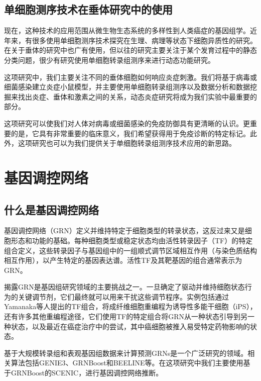 \subsection{单细胞测序技术在垂体研究中的使用}
  现在，这种技术的应用范围从微生物生态系统的多样性到人类癌症的基因组学。近年来，有很多使用单细胞测序技术探究在生理、病理等状态下细胞异质性的研究\cite{hammond2019single,keren2017unique,li2019developmental,masuda2019spatial,masuda2020novel,matcovitch2016microglia}。
在关于垂体的研究中也广有使用，但以往的研究\cite{chen2020single,cheung2018single,ho2020single,fletcher2019cell}主要关注于某个发育过程中的静态分类问题，很少有研究使用单细胞转录组测序来进行动态功能研究。

  这项研究中，我们主要关注不同的垂体细胞如何响应炎症刺激。我们将基于病毒或细菌感染建立炎症小鼠模型，并主要使用单细胞转录组测序以及数据分析和数据挖掘来找出炎症、垂体和激素之间的关系，动态炎症研究将成为我们实验中最重要的部分。

  这项研究可以使我们对人体对病毒或细菌感染的免疫防御具有更清晰的认识。更重要的是，它具有非常重要的临床意义，我们希望获得用于免疫诊断的特定标记。此外，这项研究也可以为我们提供关于单细胞转录组测序技术应用的新思路。

\section{基因调控网络}

\subsection{什么是基因调控网络}
  基因调控网络（GRN）定义并维持特定于细胞类型的转录状态，这反过来又是细胞形态和功能的基础。每种细胞类型或稳定状态均由活性转录因子（TF）的特定组合定义，这些转录因子与基因组中的一组顺式调节区域相互作用（与染色质结构相互作用），以产生特定的基因表达谱\cite{fiers2018mapping,arendt2016origin}。活性TF及其靶基因的组合通常表示为GRN。

  揭露GRN是基因组研究领域的主要挑战之一。一旦确定了驱动并维持细胞状态行为的关键调节剂，它们最终就可以用来干扰这些调节程序。实例包括通过Yamanaka等人\cite{takahashi2006induction}提出的TF组合，将成纤维细胞重编程为诱导性多能干细胞（iPS），还有许多其他重编程途径，它们使用TF的特定组合将GRN从一种状态引导到另一种状态\cite{marro2011direct,ieda2010direct}，以及最近在癌症治疗中的尝试，其中癌细胞被推入易受特定药物影响的状态\cite{creixell2012navigating,wouters2017decoding}。

  基于大规模转录组和表观基因组数据来计算预测GRNs是一个广泛研究的领域。相关算法包括GENIE3\cite{huynh2010inferring}、GRNBoost\cite{moerman2019grnboost2}和BEELINE\cite{pratapa2020benchmarking}等。在这项研究中我们主要使用基于GRNBoost的SCENIC\cite{aibar2017scenic,van2020scalable}，进行基因调控网络推断。
